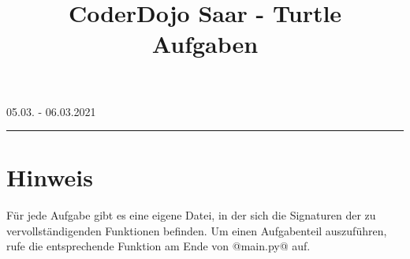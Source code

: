 

\title{CoderDojo Saar - Turtle\\\textbf{Aufgaben}}


    \maketitle    
    
    \begin{center}
        \vspace{-1.5em}
        05.03. - 06.03.2021
        \rule{\textwidth}{1pt}
    \end{center}

    \section*{Hinweis}
    Für jede Aufgabe gibt es eine eigene Datei, in der sich die Signaturen der zu vervollständigenden Funktionen befinden.
    Um einen Aufgabenteil auszuführen, rufe die entsprechende Funktion am Ende von @main.py@ auf.

